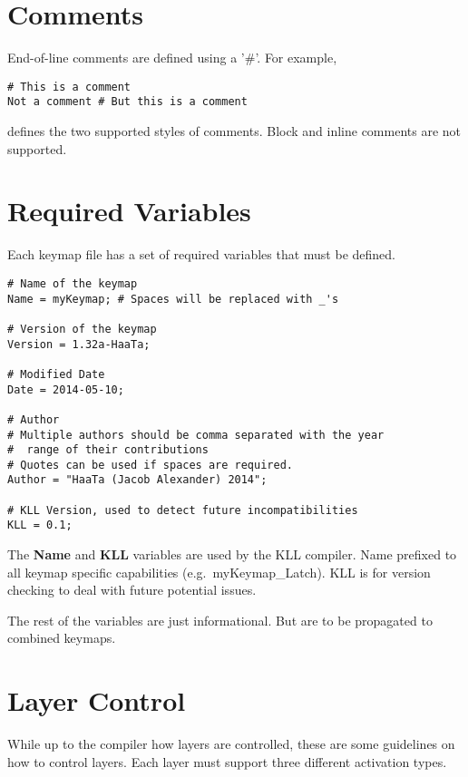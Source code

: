 \documentclass{kiibohd-template}
\begin{document}
\section{Comments}

End-of-line comments are defined using a '\#'.
For example,

\begin{lstlisting}
# This is a comment
Not a comment # But this is a comment
\end{lstlisting}

defines the two supported styles of comments.
Block and inline comments are not supported.


\section{Required Variables}

Each keymap file has a set of required variables that must be defined.

\begin{lstlisting}
# Name of the keymap
Name = myKeymap; # Spaces will be replaced with _'s

# Version of the keymap
Version = 1.32a-HaaTa;

# Modified Date
Date = 2014-05-10;

# Author
# Multiple authors should be comma separated with the year
#  range of their contributions
# Quotes can be used if spaces are required.
Author = "HaaTa (Jacob Alexander) 2014";

# KLL Version, used to detect future incompatibilities
KLL = 0.1;
\end{lstlisting}

The \textbf{Name} and \textbf{KLL} variables are used by the KLL compiler.
Name prefixed to all keymap specific capabilities (e.g.\ myKeymap\_Latch).
KLL is for version checking to deal with future potential issues.

The rest of the variables are just informational.
But are to be propagated to combined keymaps.


\section{Layer Control}

While up to the compiler how layers are controlled, these are some guidelines on how to control layers.
Each layer must support three different activation types.
\end{document}
